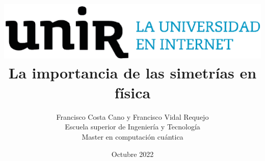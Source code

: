 \documentclass[12pt]{article}
\begin{document}
	\title{\includegraphics[scale=0.75]{logo}\\La importancia de las simetrías en física}
	\author{Francisco Costa Cano y Francisco Vidal Requejo\\
	Escuela superior de Ingeniería y Tecnología\\Master en computación cuántica}
	\date{Octubre 2022}
	\maketitle
  
	\tableofcontents

	\setlength{\parskip}{\baselineskip}
	
	
	
	
	
	
	
	
	\printbibliography

	\printindex
\end{document}
